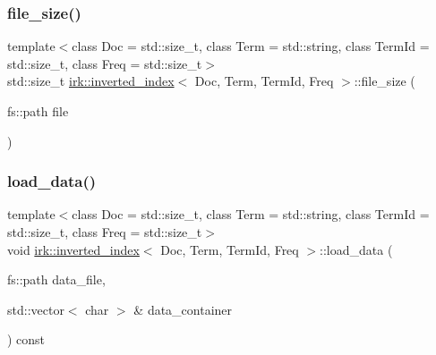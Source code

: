 \mbox{\label{classirk_1_1inverted__index_a06e5f0eb312766fe8ad96c054a9ec310}} 
\subsubsection{\texorpdfstring{file\+\_\+size()}{file\_size()}}
{\footnotesize\ttfamily template$<$class Doc  = std\+::size\+\_\+t, class Term  = std\+::string, class Term\+Id  = std\+::size\+\_\+t, class Freq  = std\+::size\+\_\+t$>$ \\
std\+::size\+\_\+t \mbox{\hyperlink{classirk_1_1inverted__index}{irk\+::inverted\+\_\+index}}$<$ Doc, Term, Term\+Id, Freq $>$\+::file\+\_\+size (\begin{DoxyParamCaption}\item[{fs\+::path}]{file }\end{DoxyParamCaption})\hspace{0.3cm}{\ttfamily [inline]}}

\mbox{\label{classirk_1_1inverted__index_a231961e5ef231dabb4cd02becb64db5a}} 
\subsubsection{\texorpdfstring{load\+\_\+data()}{load\_data()}\hspace{0.1cm}{\footnotesize\ttfamily [1/2]}}
{\footnotesize\ttfamily template$<$class Doc  = std\+::size\+\_\+t, class Term  = std\+::string, class Term\+Id  = std\+::size\+\_\+t, class Freq  = std\+::size\+\_\+t$>$ \\
void \mbox{\hyperlink{classirk_1_1inverted__index}{irk\+::inverted\+\_\+index}}$<$ Doc, Term, Term\+Id, Freq $>$\+::load\+\_\+data (\begin{DoxyParamCaption}\item[{fs\+::path}]{data\+\_\+file,  }\item[{std\+::vector$<$ char $>$ \&}]{data\+\_\+container }\end{DoxyParamCaption}) const\hspace{0.3cm}{\ttfamily [inline]}}

